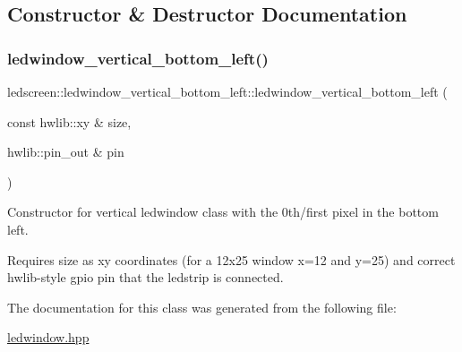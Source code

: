 \subsection{Constructor \& Destructor Documentation}
\mbox{\label{classledscreen_1_1ledwindow__vertical__bottom__left_afa6fd9240706d39f3b7278a0567c8c45}} 
\subsubsection{\texorpdfstring{ledwindow\+\_\+vertical\+\_\+bottom\+\_\+left()}{ledwindow\_vertical\_bottom\_left()}}
{\footnotesize\ttfamily ledscreen\+::ledwindow\+\_\+vertical\+\_\+bottom\+\_\+left\+::ledwindow\+\_\+vertical\+\_\+bottom\+\_\+left (\begin{DoxyParamCaption}\item[{const hwlib\+::xy \&}]{size,  }\item[{hwlib\+::pin\+\_\+out \&}]{pin }\end{DoxyParamCaption})\hspace{0.3cm}{\ttfamily [inline]}}



Constructor for vertical ledwindow class with the 0th/first pixel in the bottom left. 

Requires size as xy coordinates (for a 12x25 window x=12 and y=25) and correct hwlib-\/style gpio pin that the ledstrip is connected. 

The documentation for this class was generated from the following file\+:\begin{DoxyCompactItemize}
\item 
\hyperlink{ledwindow_8hpp}{ledwindow.\+hpp}\end{DoxyCompactItemize}
